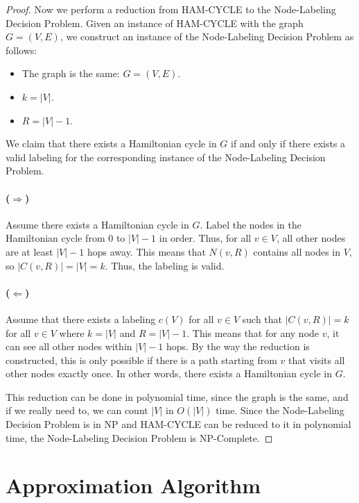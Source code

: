 \documentclass{article}
\begin{document}
\begin{proof}
    Now we perform a reduction from HAM-CYCLE to the Node-Labeling Decision Problem.
    Given an instance of HAM-CYCLE with the graph $G = (V, E)$, we construct an instance of the Node-Labeling Decision Problem as follows:
    \begin{itemize}
        \item The graph is the same: $G = (V, E)$.
        \item $k = |V|$.
        \item $R = |V| - 1$.
    \end{itemize}
    We claim that there exists a Hamiltonian cycle in $G$ if and only if there exists a valid labeling for the corresponding instance of the Node-Labeling Decision Problem.
    \paragraph{($\Rightarrow$)} Assume there exists a Hamiltonian cycle in $G$.
    Label the nodes in the Hamiltonian cycle from $0$ to $|V| - 1$ in order.
    Thus, for all $v \in V$, all other nodes are at least $|V| - 1$ hops away.
    This means that $N(v, R)$ contains all nodes in $V$, so $|C(v, R)| = |V| = k$.
    Thus, the labeling is valid.
    \paragraph{($\Leftarrow$)} Assume that there exists a labeling $c(V)$ for all $v \in V$ such that $|C(v, R)| = k$ for all $v \in V$ where $k = |V|$ and $R = |V| - 1$.
    This means that for any node $v$, it can see all other nodes within $|V| - 1$ hops.
    By the way the reduction is constructed, this is only possible if there is a path starting from $v$ that visits all other nodes exactly once.
    In other words, there exists a Hamiltonian cycle in $G$.
    
    \vspace{1em}
    This reduction can be done in polynomial time, since the graph is the same, and if we really need to, we can count $|V|$ in $O(|V|)$ time.
    Since the Node-Labeling Decision Problem is in NP and HAM-CYCLE can be reduced to it in polynomial time, the Node-Labeling Decision Problem is NP-Complete.
\end{proof}

\section{Approximation Algorithm}
\end{document}
